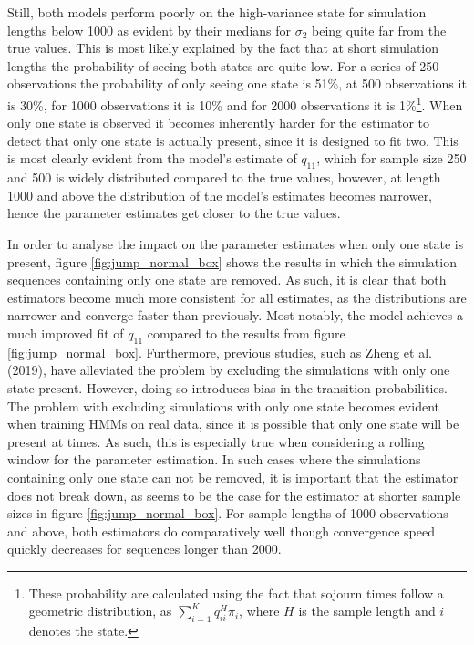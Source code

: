 Still, both models perform poorly on the high-variance state for simulation lengths below 1000 as evident by their medians for $\sigma_2$ being quite far from the true values. This is most likely explained by the fact that at short simulation lengths the probability of seeing both states are quite low. For a series of 250 observations the probability of only seeing one state is 51\%, at 500 observations it is 30\%, for 1000 observations it is 10\% and for 2000 observations it is 1\%\footnote
{These probability are calculated using the fact that sojourn times follow a geometric distribution, as $\sum_{i=1}^K q_{ii}^H\pi_i$, where $H$ is the sample length and $i$ denotes the state.
}. 
When only one state is observed it becomes inherently harder for the estimator to detect that only one state is actually present, since it is designed to fit two. This is most clearly evident from the \mle model's estimate of $q_{11}$, which for sample size 250 and 500 is widely distributed compared to the true values, however, at length 1000 and above the distribution of the model's estimates becomes narrower, hence the parameter estimates get closer to the true values.

In order to analyse the impact on the parameter estimates when only one state is present, figure \ref{fig:jump_normal_box} shows the results in which the simulation sequences containing only one state are removed. As such, it is clear that both estimators become much more consistent for all estimates, as the distributions are narrower and converge faster than previously. Most notably, the \mle model achieves a much improved fit of $q_{11}$ compared to the results from figure \ref{fig:jump_normal_box}. Furthermore, previous studies, such as Zheng et al. (2019), have alleviated the problem by excluding the simulations with only one state present. However, doing so introduces bias in the transition probabilities. The problem with excluding simulations with only one state becomes evident when training HMMs on real data, since it is possible that only one state will be present at times. As such, this is especially true when considering a rolling window for the parameter estimation. In such cases where the simulations containing only one state can not be removed, it is important that the estimator does not break down, as seems to be the case for the \mle estimator at shorter sample sizes in figure \ref{fig:jump_normal_box}. For sample lengths of 1000 observations and above, both estimators do comparatively well though convergence speed quickly decreases for sequences longer than 2000.

